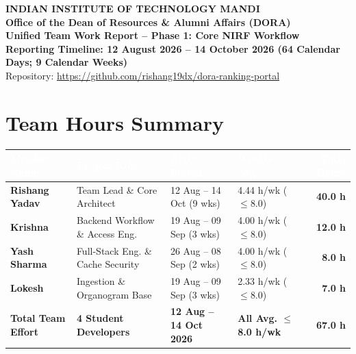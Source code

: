 \documentclass[11pt,a4paper]{article}
\begin{document}
\begin{center}
{\large\bfseries\color{primary} INDIAN INSTITUTE OF TECHNOLOGY MANDI}\\[2pt]
{\normalsize\bfseries Office of the Dean of Resources \& Alumni Affairs (DORA)}\\[4pt]
{\Large\bfseries Unified Team Work Report -- Phase 1: Core NIRF Workflow}\\[2pt]
{\small\bfseries Reporting Timeline: 12 August 2026 -- 14 October 2026 (64 Calendar Days; 9 Calendar Weeks)}\\[2pt]
{\small Repository: \url{https://github.com/rishang19dx/dora-ranking-portal}}
\end{center}

\vspace{0.2cm}

\section{Team Hours Summary}

\begin{table}[h]
\centering
\small
\renewcommand{\arraystretch}{1.2}
\begin{tabular}{p{3.2cm} p{4.2cm} p{3.2cm} p{2.8cm} r}
\toprule
\rowcolor{primary}
\textcolor{white}{\textbf{Member Name}} & \textcolor{white}{\textbf{Project Role}} & \textcolor{white}{\textbf{Active Period}} & \textcolor{white}{\textbf{Weekly Avg.}} & \textcolor{white}{\textbf{Total Hours}} \\
\midrule
\textbf{Rishang Yadav} & Team Lead \& Core Architect & 12 Aug -- 14 Oct (9 wks) & 4.44 h/wk ($\le 8.0$) & \textbf{40.0 h} \\
\rowcolor{lightbg}
\textbf{Krishna} & Backend Workflow \& Access Eng. & 19 Aug -- 09 Sep (3 wks) & 4.00 h/wk ($\le 8.0$) & \textbf{12.0 h} \\
\textbf{Yash Sharma} & Full-Stack Eng. \& Cache Security & 26 Aug -- 08 Sep (2 wks) & 4.00 h/wk ($\le 8.0$) & \textbf{8.0 h} \\
\rowcolor{lightbg}
\textbf{Lokesh} & Ingestion \& Organogram Base & 19 Aug -- 09 Sep (3 wks) & 2.33 h/wk ($\le 8.0$) & \textbf{7.0 h} \\
\midrule
\rowcolor{secondary!15}
\textbf{Total Team Effort} & \textbf{4 Student Developers} & \textbf{12 Aug -- 14 Oct 2026} & \textbf{All Avg. $\le$ 8.0 h/wk} & \textbf{67.0 h} \\
\bottomrule
\end{tabular}
\end{table}
\end{document}
